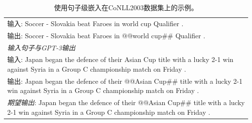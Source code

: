 \documentclass[supercite]{Experimental_Report}
\theoremstyle{definition}
\begin{document}
\begin{table}[th!]
{\begin{tabular}{l}
输入: Soccer - Slovakia beat Faroes in world cup Qualifier . \\
输出: Soccer - Slovakia beat Faroes in @@world cup\#\# Qualifier . \\\midrule
\textit{输入句子与GPT-3输出} \\
输入: Japan began the defence of their Asian Cup title with a lucky 2-1 win against Syria in a Group C championship match on Friday . \\
输出: Japan began the defence of their @@Asian Cup\#\# title with a lucky 2-1 win against Syria in a Group C championship match on Friday . \\
{\color{blue}\it 期望输出}: Japan began the defence of their @@Asian Cup\#\# title with a lucky 2-1 win against Syria in a Group C championship match on Friday . \\\bottomrule

    \end{tabular}
    }
     \caption{使用句子级嵌入在CoNLL2003数据集上的示例。}
    \label{tab:example_sentence_level_embedding}
\end{table}
\end{document}
